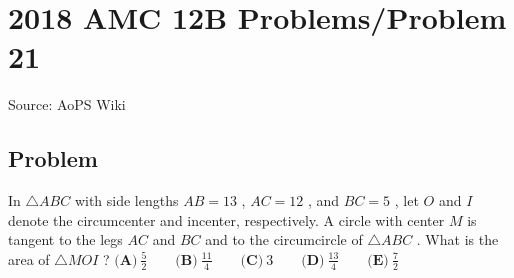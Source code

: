 \documentclass[12pt]{article}
\begin{document}
\section*{{2018 AMC 12B Problems/Problem 21}}
Source: AoPS Wiki

\subsection*{Problem}
In $\triangle{ABC}$ with side lengths $AB = 13$ , $AC = 12$ , and $BC = 5$ , let $O$ and $I$ denote the circumcenter and incenter, respectively. A circle with center $M$ is tangent to the legs $AC$ and $BC$ and to the circumcircle of $\triangle{ABC}$ . What is the area of $\triangle{MOI}$ ? $\textbf{(A)}\ \frac52\qquad\textbf{(B)}\ \frac{11}{4}\qquad\textbf{(C)}\ 3\qquad\textbf{(D)}\ \frac{13}{4}\qquad\textbf{(E)}\ \frac72$
\end{document}
